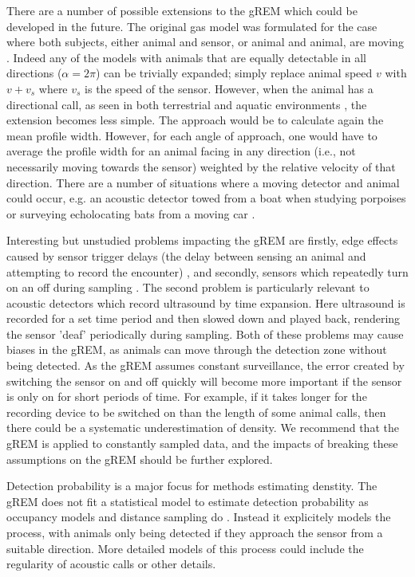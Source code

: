 \documentclass[a4paper,10pt,reqno,oneside]{amsart}
\begin{document}
There are a number of possible extensions to the gREM which could be developed in the future. The original gas model was formulated for the case where both subjects, either animal and sensor, or animal and animal, are moving \citep{Hutchinson_Waser_2007}. Indeed any of the models with animals that are equally detectable in all directions ($\alpha = 2\pi$) can be trivially expanded; simply replace animal speed $v$ with $v + v_s$ where $v_s$ is the speed of the sensor. However, when the animal has a directional call, as seen in both terrestrial and aquatic environments \citep{lammers2003directionality,blumstein2011acoustic}, the extension becomes less simple. The approach would be to calculate again the mean profile width. However, for each angle of approach, one would have to average the profile width for an animal facing in any direction (i.e., not necessarily moving towards the sensor) weighted by the relative velocity of that direction. There are a number of situations where a moving detector and animal could occur, e.g. an acoustic detector towed from a boat when studying porpoises \citep{kimura2014acoustic} or surveying echolocating bats from a moving car \citep{ahlen1999use, jones2011indicator}. 

Interesting but unstudied problems impacting the gREM are firstly, edge effects caused by sensor trigger delays (the delay between sensing an animal and attempting to record the encounter) \citep{rovero2013camera}, and secondly, sensors which repeatedly turn on an off during sampling \citep{jones2011indicator}. The second problem is particularly relevant to acoustic detectors which record ultrasound by time expansion. Here ultrasound is recorded for a set time period and then slowed down and played back, rendering the sensor 'deaf' periodically during sampling. Both of these problems may cause biases in the gREM, as animals can move through the detection zone without being detected. As the gREM assumes constant surveillance, the error created by switching the sensor on and off quickly will become more important if the sensor is only on for short periods of time. For example, if it takes longer for the recording device to be switched on than the length of some animal calls, then there could be a systematic underestimation of density. We recommend that the gREM is applied to constantly sampled data, and the impacts of breaking these assumptions on the gREM should be further explored. 

Detection probability is a major focus for methods estimating denstity. The gREM does not fit a statistical model to estimate detection probability as occupancy models and distance sampling do \citep{royle2003estimating, barlow2005estimates, marques2011estimating}. Instead it explicitely models the process, with animals only being detected if they approach the sensor from a suitable direction. More detailed models of this process could include the regularity of acoustic calls or other details. 
\end{document}
